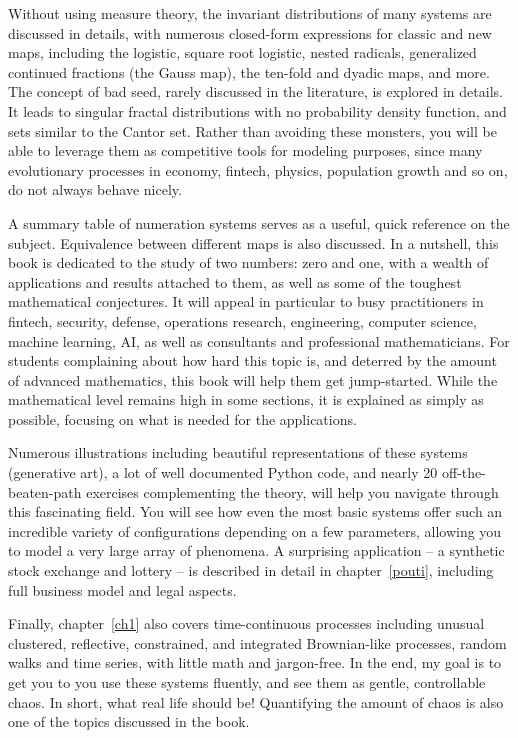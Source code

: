 \documentclass[oneside,10pt]{book}
\begin{document}
Without using measure theory, the invariant distributions of many systems are discussed in details, with numerous closed-form expressions for classic and new
 maps, including the logistic, square root logistic, nested radicals, generalized continued fractions (the Gauss map), the ten-fold and dyadic maps, and more. The concept of bad seed, rarely discussed in the literature, is explored in details. It leads to singular fractal distributions with
 no probability density function, and sets similar to the Cantor set. Rather than avoiding these monsters, you will be able to leverage them
 as competitive tools for modeling purposes, since many evolutionary processes in economy, fintech, physics, population growth and so on, do not always behave nicely.

A summary table of  numeration systems serves as a useful, quick reference on the subject. Equivalence between different maps is also discussed. In a nutshell, this book is dedicated to the study of two numbers: zero and one, with
 a wealth of applications and results attached to them, as well as some of the toughest mathematical conjectures. It will appeal in particular to busy practitioners
 in fintech, security, defense, operations research, engineering, computer science, machine learning, AI, as well as consultants
 and professional mathematicians. For students complaining about how hard this topic is, and deterred by the amount of advanced mathematics, this book will help them get jump-started. While the mathematical level remains high in some sections, it is explained as
 simply as possible, focusing on what is needed for the applications.

Numerous illustrations including beautiful representations of these systems (generative art), a lot of well documented Python code, and nearly 20 off-the-beaten-path exercises complementing the theory, will help you navigate through this fascinating field.
 You will see how even the most basic systems offer such an incredible variety of configurations depending on a few parameters, allowing you
 to model a very large array of phenomena.  A surprising application -- a synthetic stock exchange and lottery -- is described in detail in chapter~\ref{pouti}, including full business model and legal aspects.

Finally, chapter~\ref{ch1}
 also covers time-continuous processes including unusual clustered, reflective, constrained, and integrated Brownian-like processes, random walks and time series, with little math and jargon-free. In the end, my goal is to
get you to you use these systems fluently, and see them as gentle, controllable chaos. In short, what real life should be! Quantifying the amount
 of chaos is also one of the topics discussed in the book.
\end{document}
